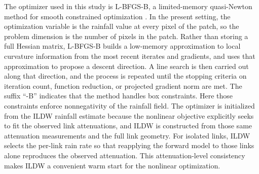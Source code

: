 \documentclass[11pt]{article}
\begin{document}
The optimizer used in this study is L-BFGS-B, a limited-memory quasi-Newton method for smooth constrained optimization \citep{byrd1995limited,zhu1997algorithm}.  In the present setting, the optimization variable is the rainfall value at every pixel of the patch, so the problem dimension is the number of pixels in the patch. Rather than storing a full Hessian matrix, L-BFGS-B builds a low-memory approximation to local curvature information from the most recent iterates and gradients, and uses that approximation to propose a descent direction. A line search is then carried out along that direction, and the process is repeated until the stopping criteria on iteration count, function reduction, or projected gradient norm are met. The suffix ``-B'' indicates that the method handles box constraints. Here those constraints enforce nonnegativity of the rainfall field. The optimizer is initialized from the ILDW rainfall estimate because the nonlinear objective explicitly seeks to fit the observed link attenuations, and ILDW is constructed from those same attenuation measurements and the full link geometry. For isolated links, ILDW selects the per-link rain rate so that reapplying the forward model to those links alone reproduces the observed attenuation. This attenuation-level consistency makes ILDW a convenient warm start for the nonlinear optimization.
\end{document}
